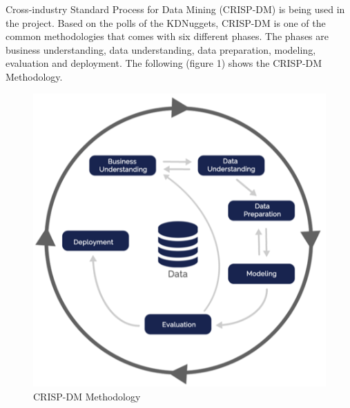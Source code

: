 \documentclass[
  a4paper,
]{article}
\begin{document}
Cross-industry Standard Process for Data Mining (CRISP-DM) is being used
in the project. Based on the polls of the KDNuggets, CRISP-DM is one of
the common methodologies that comes with six different phases. The
phases are business understanding, data understanding, data preparation,
modeling, evaluation and deployment. The following (figure 1) shows the
CRISP-DM Methodology.

\begin{figure}[h!]

{\centering \includegraphics[width=6.31in]{crisp-dm} 

}

\caption{CRISP-DM Methodology}\label{fig:unnamed-chunk-2}
\end{figure}
\end{document}
